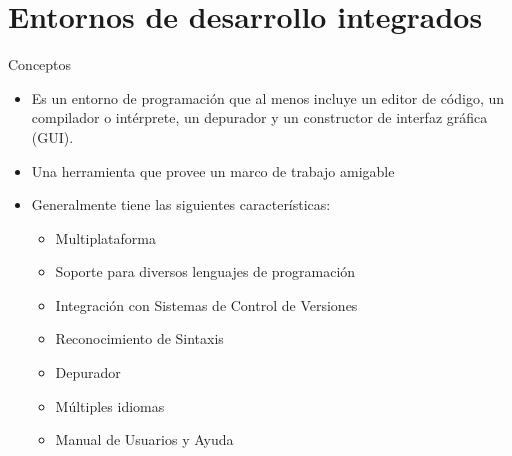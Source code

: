 \section{Entornos de desarrollo integrados}

\begin{frame}[c]{Conceptos}
  \begin{itemize}
    \item Es un entorno de programación que al menos incluye un editor de
      código, un compilador o intérprete, un depurador y un constructor de
      interfaz gráfica (GUI).
    \pausa
    \item Una herramienta que provee un marco de trabajo amigable
    \pausa
    \item Generalmente tiene las siguientes características:
      \begin{itemize}
        \item Multiplataforma
        \pausa
        \item Soporte para diversos lenguajes de programación
        \pausa
        \item Integración con Sistemas de Control de Versiones
        \pausa
        \item Reconocimiento de Sintaxis
        \pausa
        \item Depurador
        \pausa
        \item Múltiples idiomas
        \pausa
        \item Manual de Usuarios y Ayuda
      \end{itemize}
  \end{itemize}
\end{frame}

